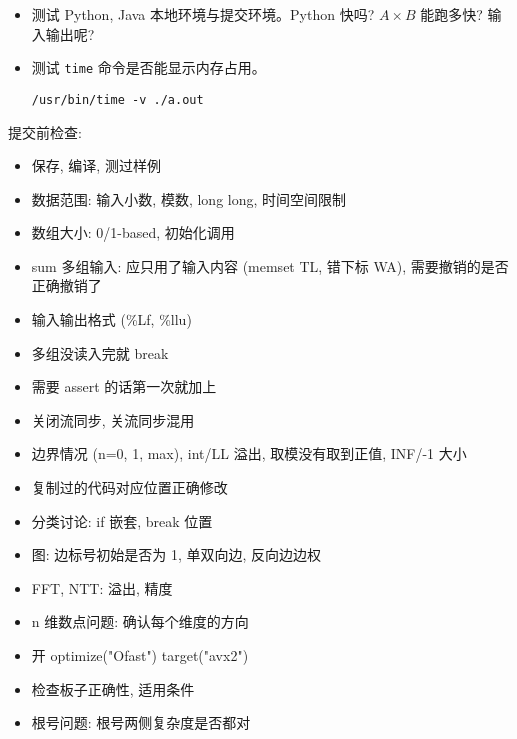 \begin{small}
\begin{itemize}[leftmargin=1mm]
\begin{verbatim}
\end{verbatim}
    \item 测试 Python, Java 本地环境与提交环境。Python 快吗? $A\times B$ 能跑多快? 输入输出呢? 
    \item 测试 \texttt{time} 命令是否能显示内存占用。
\begin{verbatim}
/usr/bin/time -v ./a.out
\end{verbatim}
\end{itemize}
提交前检查: 
\begin{itemize}[leftmargin=1mm]
    \setlength{\itemsep}{0pt}
    \setlength{\parskip}{0.5pt}
\item 保存, 编译, 测过样例
\item 数据范围: 输入小数, 模数, long long, 时间空间限制
\item 数组大小: 0/1-based, 初始化调用
\item sum 多组输入: 应只用了输入内容 (memset TL, 错下标 WA), 需要撤销的是否正确撤销了
\item 输入输出格式 (\%Lf, \%llu)
\item 多组没读入完就 break
\item 需要 assert 的话第一次就加上
\item 关闭流同步, 关流同步混用
\item 边界情况 (n=0, 1, max), int/LL 溢出, 取模没有取到正值, INF/-1 大小
\item 复制过的代码对应位置正确修改
\item 分类讨论: if 嵌套, break 位置
\item 图: 边标号初始是否为 1, 单双向边, 反向边边权
\item FFT, NTT: 溢出, 精度
\item n 维数点问题: 确认每个维度的方向
\item 开 optimize("Ofast") target("avx2")
\item 检查板子正确性, 适用条件
\item 根号问题: 根号两侧复杂度是否都对
\end{itemize}
\end{small}